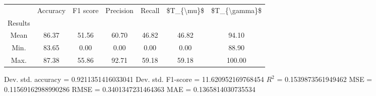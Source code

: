 \begin{tabular}{|c|c|c|c|c|c|c|}
\toprule
{} &  Accuracy &  F1 score &  Precision &  Recall &  \$T\_\{\textbackslash mu\}\$ &  \$T\_\{\textbackslash gamma\}\$ \\
Results &           &           &            &         &            &               \\
\hline
Mean    &     86.37 &     51.56 &      60.70 &   46.82 &      46.82 &         94.10 \\
Min.    &     83.65 &      0.00 &       0.00 &    0.00 &       0.00 &         88.90 \\
Max.    &     87.38 &     55.86 &      92.71 &   59.18 &      59.18 &        100.00 \\
\bottomrule
\end{tabular}

 Dev. std. accuracy = 0.9211351416033041
 Dev. std. F1-score = 11.620952169768454
 $R^2$ = 0.1539873561949462
 MSE = 0.11569162988990286
 RMSE = 0.3401347231464363
 MAE = 0.1365814030735534